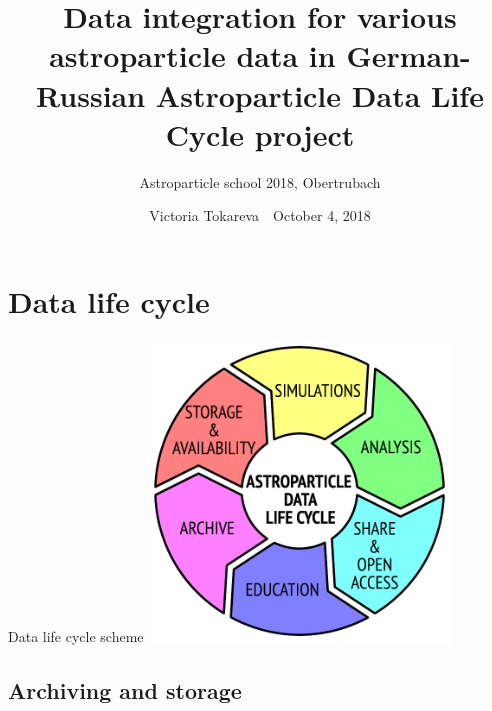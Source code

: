 \documentclass[18pt]{beamer}
\title[Cosmic rays data center based on KCDC]{Data integration for various astroparticle data in German-Russian Astroparticle Data Life Cycle project}
\subtitle{Astroparticle school 2018, Obertrubach}
\author[Victoria Tokareva]{
  Victoria Tokareva~\textbar~October 4, 2018
}
\institute{Institute for Nuclear Physics (IKP)}
\begin{document}



\section{Data life cycle}

\begin{frame}{Data life cycle scheme}
\centering
\includegraphics[width=0.6\textwidth]{pics/ADLC.pdf}
\end{frame}

\subsection{Archiving and storage}
\end{document}
